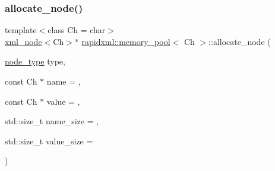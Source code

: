 \mbox{\label{classrapidxml_1_1memory__pool_a4118581c29ee9a2f6b55ebf7dac185f8}} 
\subsubsection{\texorpdfstring{allocate\_node()}{allocate\_node()}}
{\footnotesize\ttfamily template$<$class Ch  = char$>$ \\
\mbox{\hyperlink{classrapidxml_1_1xml__node}{xml\+\_\+node}}$<$Ch$>$$\ast$ \mbox{\hyperlink{classrapidxml_1_1memory__pool}{rapidxml\+::memory\+\_\+pool}}$<$ Ch $>$\+::allocate\+\_\+node (\begin{DoxyParamCaption}\item[{\mbox{\hyperlink{namespacerapidxml_abb456db38f7efb746c4330eed6072a7c}{node\+\_\+type}}}]{type,  }\item[{const Ch $\ast$}]{name = {},  }\item[{const Ch $\ast$}]{value = {},  }\item[{std\+::size\+\_\+t}]{name\+\_\+size = {},  }\item[{std\+::size\+\_\+t}]{value\+\_\+size = {} }\end{DoxyParamCaption})\hspace{0.3cm}{\ttfamily [inline]}}

